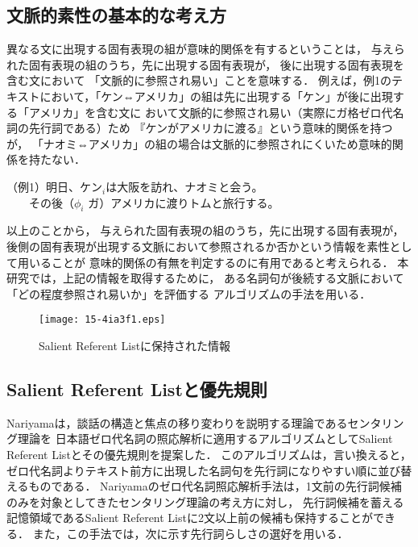 \documentclass[japanese]{jnlp_1.4}
\begin{document}
\subsection{文脈的素性の基本的な考え方}
\label{anaphora}

異なる文に出現する固有表現の組が意味的関係を有するということは，
与えられた固有表現の組のうち，先に出現する固有表現が，
後に出現する固有表現を含む文において
「文脈的に参照され易い」ことを意味する．
例えば，例1のテキストにおいて，「ケン⇔アメリカ」の組は先に出現する「ケン」が後に出現する「アメリカ」を含む文に
おいて文脈的に参照され易い（実際にガ格ゼロ代名詞の先行詞である）ため
『ケンがアメリカに渡る』という意味的関係を持つが，
「ナオミ⇔アメリカ」の組の場合は文脈的に参照されにくいため意味的関係を持たない．

\vspace{1\baselineskip}
（例1）明日、$ケン_{i}$は大阪を訪れ、ナオミと会う。\\
　　\phantom{（例1）}その後（$\phi_{i}$ ガ）アメリカに渡りトムと旅行する。
\vspace{1\baselineskip}



以上のことから，
与えられた固有表現の組のうち，先に出現する固有表現が，
後側の固有表現が出現する文脈において参照されるか否かという情報を素性として用いることが
意味的関係の有無を判定するのに有用であると考えられる．
本研究では，上記の情報を取得するために，
ある名詞句が後続する文脈において「どの程度参照され易いか」を評価する
アルゴリズムの手法を用いる．


\begin{figure}[t]
  \begin{center}
  \texttt{[image: 15-4ia3f1.eps]}
  \end{center}
  \caption{Salient Referent Listに保持された情報}
  \label{center}
\end{figure}

\subsection{Salient Referent Listと優先規則}
\label{centering}

Nariyamaは，談話の構造と焦点の移り変わりを説明する理論であるセンタリング理論{\cite{grosz1983pua}}を
日本語ゼロ代名詞の照応解析に適用するアルゴリズムとしてSalient Referent Listとその優先規則を提案した．
このアルゴリズムは，言い換えると，ゼロ代名詞よりテキスト前方に出現した名詞句を先行詞になりやすい順に並び替えるものである．
Nariyamaのゼロ代名詞照応解析手法は，1文前の先行詞候補のみを対象としてきたセンタリング理論の考え方に対し，
先行詞候補を蓄える記憶領域であるSalient Referent Listに2文以上前の候補も保持することができる．
また，この手法では，次に示す先行詞らしさの選好を用いる．
\end{document}
